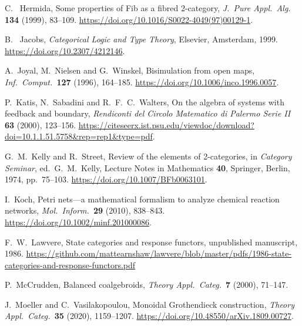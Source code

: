 \documentclass[a4paper,onecolumn, superscriptaddress,10pt, accepted=2022-03-25, issue=SS, volume=VV, shorttitle=papers/compositionality-VV-SS]{compositionalityarticle}
\begin{document}
\begin{thebibliography}{100}
 C. \ Hermida, Some properties of Fib as a fibred 2-category, \textsl{J.\ Pure Appl.\ Alg.\ } \textbf{134} (1999), 83--109. 
\href{https://doi.org/10.1016/S0022-4049(97)00129-1}{https://doi.org/10.1016/S0022-4049(97)00129-1}.

 B. \ Jacobs, \textsl{Categorical Logic and Type Theory}, Elsevier, Amsterdam, 1999. 
\href{https://doi.org/10.2307/421214}{https://doi.org/10.2307/4212146}.

 A.\ Joyal, M.\ Nielsen and G.\ Winskel, Bisimulation from open maps, \textsl{Inf.\ Comput.\ }\textbf{127} (1996), 164--185. 
\href{https://doi.org/10.1006/inco.1996.0057}{https://doi.org/10.1006/inco.1996.0057}.

 P.\ Katis, N.\ Sabadini and R.\ F.\ C.\ Walters, On the algebra of systems with feedback and boundary, \textsl{Rendiconti del Circolo Matematico di Palermo Serie II} \textbf{63} (2000), 123--156.   \href{https://citeseerx.ist.psu.edu/viewdoc/download?doi=10.1.1.51.5758&rep=rep1&type=pdf}{https://citeseerx.ist.psu.edu/viewdoc/download?doi=10.1.1.51.5758\&rep=rep1\&type=pdf}.

 G.\ M.\ Kelly and R.\ Street, Review of the elements of 2-categories, in \textsl{Category Seminar}, ed.\ G.\ M.\ Kelly, Lecture Notes in 
Mathematics \textbf{40}, Springer, Berlin, 1974, pp.\ 75--103. \href{https://doi.org/10.1007/BFb0063101}{https://doi.org/10.1007/BFb0063101}.

 I.\ Koch, Petri nets---a mathematical formalism to analyze chemical reaction
networks, \textsl{Mol.\ Inform.\  }\textbf{29} (2010), 838--843. 
\href{https://doi.org/10.1002/minf.201000086}{https://doi.org/10.1002/minf.201000086}.

 F.\ W.\ Lawvere, State categories and response functors, unpublished manuscript, 1986.  \href{https://github.com/mattearnshaw/lawvere/blob/master/pdfs/1986-state-categories-and-response-functors.pdf}{https://github.com/mattearnshaw/lawvere/blob/master/pdfs/1986-state-categories-and-response-functors.pdf}

 P.\ McCrudden, Balanced coalgebroids, \textsl{Theory Appl.\ Categ.\ }\textbf{7} (2000), 71--147.

 J.\ Moeller and C.\ Vasilakopoulou, Monoidal Grothendieck construction, \textsl{Theory Appl.\ Categ.\ }\textbf{35} (2020), 1159--1207.  \href{https://doi.org/10.48550/arXiv.1809.00727}{https://doi.org/10.48550/arXiv.1809.00727}.


\end{thebibliography}
\end{document}
